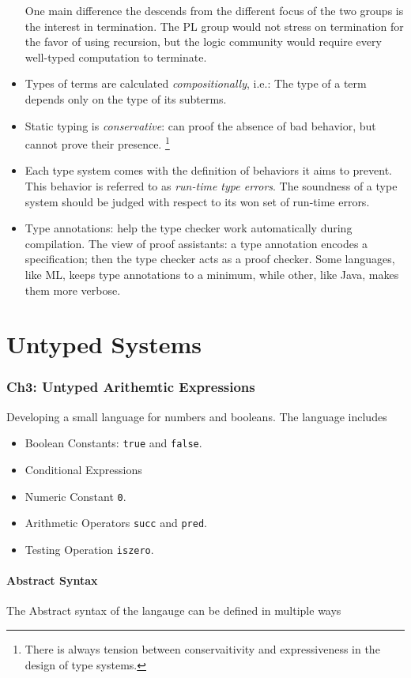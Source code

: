 \documentclass[fleqn]{article}
\begin{document}
\begin{itemize}
\begin{itemize}
	\end{itemize}
One main difference the descends from the different focus of the two groups is the interest in termination. The PL group would not stress on termination for the favor of using recursion, but the logic community would require every well-typed computation to terminate. 
\item Types of terms are calculated \emph{compositionally}, i.e.: The type of a term depends only on the type of its subterms. 
\item Static typing is \emph{conservative}: can proof the absence of bad behavior, but cannot prove their presence. \footnote{There is always tension between conservaitivity and expressiveness in the design of type systems.}
\item Each type system comes with the definition of behaviors it aims to prevent. This behavior is referred to as \emph{run-time type errors}. The soundness of a type system should be judged with respect to its won set of run-time errors. 
\item Type annotations: help the type checker work automatically during compilation. The view of proof assistants: a type annotation encodes a specification; then the type checker acts as a proof checker. Some languages, like ML, keeps type annotations to a minimum, while other, like Java, makes them more verbose. 
\end{itemize}

\newpage

\part*{Untyped Systems}

\section{Ch3: Untyped Arithemtic Expressions}
Developing a small language for numbers and booleans. The language includes
\begin{itemize}
	\item Boolean Constants: \verb|true| and \verb|false|.
	\item Conditional Expressions 
	\item Numeric Constant \verb|0|.
	\item Arithmetic Operators \verb|succ| and \verb|pred|.
	\item Testing Operation \verb|iszero|.  
\end{itemize}
\subsection*{Abstract Syntax}
The Abstract syntax of the langauge can be defined in multiple ways 
\end{document}
